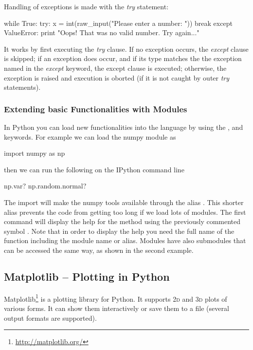 Handling of exceptions is made with the \textit{try} statement:

\begin{python}
while True:
    try:
        x = int(raw_input("Please enter a number: "))
        break
    except ValueError:
        print "Oops! That was no valid number. Try again..."
\end{python}

It works by first executing the \textit{try} clause. If no exception occurs, the \textit{except} clause is skipped; if an exception does occur, and if its type matches the the exception named in the \textit{except} keyword, the except clause is executed; otherwise, the exception is raised and execution is oborted (if it is not caught by outer \textit{try} statements).


\subsubsection{Extending basic Functionalities with Modules}

In Python you can load new functionalities into the language by using the ,  and  keywords. For example we can load the numpy module as

\begin{python}
import numpy as np
\end{python}

then we can run the following on the IPython command line

\begin{python}
np.var?
np.random.normal?
\end{python}

The import  will make the numpy tools available through the alias . This shorter alias prevents the code from getting too long if we load lots of modules. The first command will display the help for the method  using the previously commented symbol . Note that in order to display the help you need the full name of the function including the module name or alias. Modules have also submodules that can be accessed the same way, as shown in the second example.


\subsection{Matplotlib -- Plotting in Python}

Matplotlib\footnote{\url{http://matplotlib.org/}} is a plotting library for Python. It supports \textsc{2d} and \textsc{3d} plots of various forms. It can show them interactively or save them to a file (several output formats are supported).

